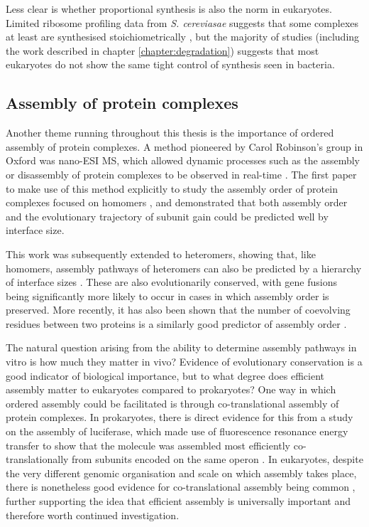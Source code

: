 \documentclass[a4paper,11pt,twoside,openright]{scrbook}
\begin{document}
Less clear is whether proportional synthesis is also the norm in eukaryotes.
Limited ribosome profiling data from \textit{S. cereviasae} suggests that some
complexes at least are synthesised stoichiometrically \cite{Brandman2012}, but
the majority of studies (including the work described in chapter
\ref{chapter:degradation}) suggests that most eukaryotes do not show the same
tight control of synthesis seen in bacteria.

\subsection{Assembly of protein complexes}
Another theme running throughout this thesis is the importance of ordered
assembly of protein complexes. A method pioneered by Carol Robinson's group in
Oxford was nano-ESI MS, which allowed dynamic processes such as the assembly or
disassembly of protein complexes to be observed in real-time
\cite{Hernandez2007}. The first paper to make use of this method explicitly to
study the assembly order of protein complexes focused on homomers
\cite{Levy2008}, and demonstrated that both assembly order and the evolutionary
trajectory of subunit gain could be predicted well by interface size.

This work was subsequently extended to heteromers, showing that, like homomers,
assembly pathways of heteromers can also be predicted by a hierarchy of
interface sizes \cite{Marsh2013}. These are also evolutionarily conserved, with
gene fusions being significantly more likely to occur in cases in which assembly
order is preserved. More recently, it has also been shown that the number of
coevolving residues between two proteins is a similarly good predictor of
assembly order \cite{Mallik2017}.

The natural question arising from the ability to determine assembly pathways in
vitro is how much they matter in vivo? Evidence of evolutionary conservation is
a good indicator of biological importance, but to what degree does efficient
assembly matter to eukaryotes compared to prokaryotes? One way in which ordered
assembly could be facilitated is through co-translational assembly of protein
complexes. In prokaryotes, there is direct evidence for this from a study on the
assembly of luciferase, which made use of fluorescence resonance energy transfer
to show that the molecule was assembled most efficiently co-translationally from
subunits encoded on the same operon \cite{Shieh2015a}. In eukaryotes, despite
the very different genomic organisation and scale on which assembly takes place,
there is nonetheless good evidence for co-translational assembly being common
\cite{Duncan2011}, further supporting the idea that efficient assembly is
universally important and therefore worth continued investigation.
\end{document}
